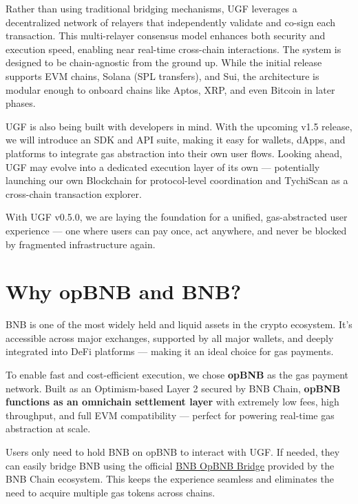 \documentclass{article}
\begin{document}
Rather than using traditional bridging mechanisms, UGF leverages a decentralized network of relayers that independently validate and co-sign each transaction. This multi-relayer consensus model enhances both security and execution speed, enabling near real-time cross-chain interactions. The system is designed to be chain-agnostic from the ground up. While the initial release supports EVM chains, Solana (SPL transfers), and Sui, the architecture is modular enough to onboard chains like Aptos, XRP, and even Bitcoin in later phases.

UGF is also being built with developers in mind. With the upcoming v1.5 release, we will introduce an SDK and API suite, making it easy for wallets, dApps, and platforms to integrate gas abstraction into their own user flows. Looking ahead, UGF may evolve into a dedicated execution layer of its own — potentially launching our own Blockchain for protocol-level coordination and TychiScan as a cross-chain transaction explorer.

With UGF v0.5.0, we are laying the foundation for a unified, gas-abstracted user experience — one where users can pay once, act anywhere, and never be blocked by fragmented infrastructure again.


\section*{Why opBNB and BNB?}

BNB is one of the most widely held and liquid assets in the crypto ecosystem. It’s accessible across major exchanges, supported by all major wallets, and deeply integrated into DeFi platforms — making it an ideal choice for gas payments.

To enable fast and cost-efficient execution, we chose \textbf{opBNB} as the gas payment network. Built as an Optimism-based Layer 2 secured by BNB Chain, \textbf{opBNB functions as an omnichain settlement layer} with extremely low fees, high throughput, and full EVM compatibility — perfect for powering real-time gas abstraction at scale.

Users only need to hold BNB on opBNB to interact with UGF. If needed, they can easily bridge BNB using the official \href{https://opbnb-bridge.bnbchain.org/}{BNB OpBNB Bridge} provided by the BNB Chain ecosystem. This keeps the experience seamless and eliminates the need to acquire multiple gas tokens across chains.

\\
\end{document}
